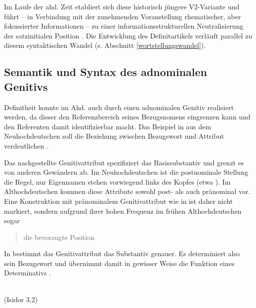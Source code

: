 Im Laufe der ahd. Zeit etabliert sich diese historisch jüngere V2-Variante und führt -- in Verbindung mit der zunehmenden Voranstellung rhematischer, aber fokussierter Informationen -- zu einer informationsstrukturellen Neutralisierung der satzinitialen Position \parencite[s.][323]{Hinterholzl2010}. Die Entwicklung des Definitartikels verläuft parallel zu diesem syntaktischen Wandel (s. Abschnitt \ref{wortstellungswandel}). 

\subsection{Semantik und Syntax des adnominalen Genitivs} \label{sec:genitiv}

Definitheit konnte im Ahd. auch durch einen adnominalen Genitiv realisiert werden, da dieser den Referenzbereich seines Bezugsnomens eingrenzen kann und den Referenten damit identifizierbar macht. Das Beispiel in  aus dem Neuhochdeutschen soll die Beziehung zwischen Bezugswort und Attribut verdeutlichen \parencite[s. auch][67f.]{Szczepaniak2011a}. 
  
\begin{exe}
	\ex \label{ex:genitiv}   
\end{exe}

\noindent
Das nachgestellte Genitivattribut  spezifiziert das Basissubstantiv   und grenzt es von anderen Gewändern ab. Im Neuhochdeutschen ist die postnominale Stellung die Regel, nur Eigennamen stehen vorwiegend links des Kopfes (etwa ). Im Althochdeutschen kommen diese Attribute sowohl post- als auch pränominal vor. Eine Konstruktion mit pränominalem Genitivattribut wie in  ist daher nicht markiert, sondern aufgrund ihrer hohen Frequenz im frühen Althochdeutschen sogar  \blockcquote[231]{Oubouzar1997}{die bevorzugte Position}. In  bestimmt das Genitivattribut  das Substantiv  genauer. Es determiniert also sein Bezugswort und übernimmt damit in gewisser Weise die Funktion eines Determinativs  \parencite[236]{Oubouzar1997}.

\begin{exe}
	\ex \label{ex:genitiv-ahd}   
	   \\
	 (Isidor 3,2)
\end{exe}
	
